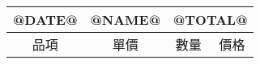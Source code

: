 \begin{tabular}{ |c|c|c|c|}\hline
@DATE@ & { @NAME@} & \multicolumn{2}{c|}{\large @TOTAL@} \\\hline
  品項&單價&數量&價格\\\hline
\end{tabular}